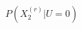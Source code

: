 \documentclass[preview]{standalone}
\begin{document}
\begin{align*}
P(X^{(r)}_2 | U=0)
\end{align*}
\end{document}
